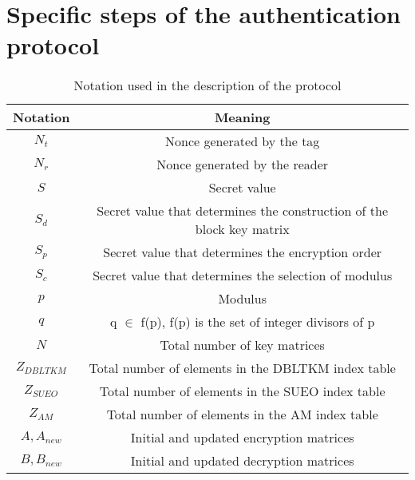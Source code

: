 \section{Specific steps of the authentication protocol}

\begin{table}[H]
    \centering
    \caption{Notation used in the description of the protocol}
    \begin{tabular}{| c | c |}
        \hline
        Notation & Meaning \\
        \hline
        $N_t$ & Nonce generated by the tag \\
        $N_r$ & Nonce generated by the reader \\
        $S$ & Secret value \\
        $S_d$ & Secret value that determines the construction of the block key matrix  \\
        $S_p$ & Secret value that determines the encryption order  \\
        $S_c$ & Secret value that determines the selection of modulus  \\
        $p$ & Modulus  \\
        $q$ & q $\in$ f(p), f(p) is the set of integer divisors of p \\
        $N$ &  Total number of key matrices \\
        $Z_{DBLTKM}$ &  Total number of elements in the DBLTKM index table \\
        $Z_{SUEO}$ & Total number of elements in the SUEO index table  \\
        $Z_{AM}$ & Total number of elements in the AM index table  \\
        $A, A_{new}$ & Initial and updated encryption matrices \\
        $B, B_{new}$ & Initial and updated decryption matrices \\
        \hline
    \end{tabular}
\end{table}

